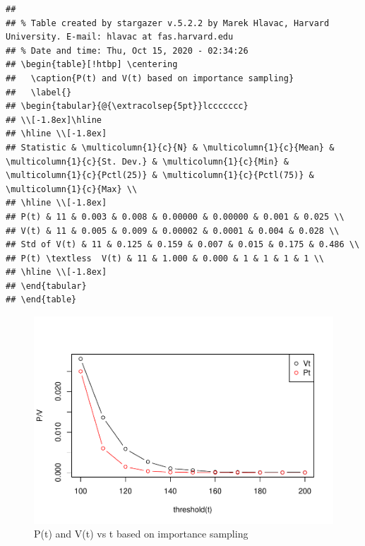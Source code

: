 \documentclass[11pt,]{article}
\begin{document}
\begin{verbatim}
## 
## % Table created by stargazer v.5.2.2 by Marek Hlavac, Harvard University. E-mail: hlavac at fas.harvard.edu
## % Date and time: Thu, Oct 15, 2020 - 02:34:26
## \begin{table}[!htbp] \centering 
##   \caption{P(t) and V(t) based on importance sampling} 
##   \label{} 
## \begin{tabular}{@{\extracolsep{5pt}}lccccccc} 
## \\[-1.8ex]\hline 
## \hline \\[-1.8ex] 
## Statistic & \multicolumn{1}{c}{N} & \multicolumn{1}{c}{Mean} & \multicolumn{1}{c}{St. Dev.} & \multicolumn{1}{c}{Min} & \multicolumn{1}{c}{Pctl(25)} & \multicolumn{1}{c}{Pctl(75)} & \multicolumn{1}{c}{Max} \\ 
## \hline \\[-1.8ex] 
## P(t) & 11 & 0.003 & 0.008 & 0.00000 & 0.00000 & 0.001 & 0.025 \\ 
## V(t) & 11 & 0.005 & 0.009 & 0.00002 & 0.0001 & 0.004 & 0.028 \\ 
## Std of V(t) & 11 & 0.125 & 0.159 & 0.007 & 0.015 & 0.175 & 0.486 \\ 
## P(t) \textless  V(t) & 11 & 1.000 & 0.000 & 1 & 1 & 1 & 1 \\ 
## \hline \\[-1.8ex] 
## \end{tabular} 
## \end{table}
\end{verbatim}

\begin{figure}
\centering
\includegraphics{figs/unnamed-chunk-25.pdf}
\caption{P(t) and V(t) vs t based on importance sampling}
\end{figure}
\end{document}
